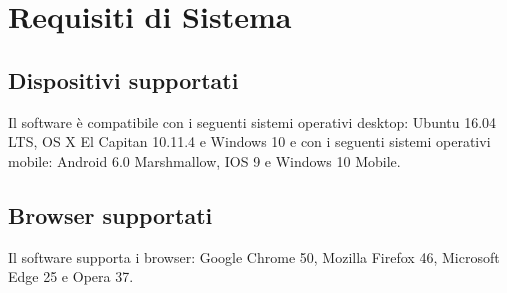 \newpage
\section{Requisiti di Sistema}
\subsection{Dispositivi supportati}
Il software \progetto{} è compatibile con i seguenti sistemi operativi desktop: Ubuntu 16.04 LTS, OS X El Capitan 10.11.4 e Windows 10 e con i seguenti sistemi operativi mobile: Android 6.0 Marshmallow, IOS 9 e Windows 10 Mobile.
\subsection{Browser supportati}
Il software \progetto{} supporta i browser: Google Chrome 50, Mozilla Firefox 46, Microsoft Edge 25 e Opera 37.